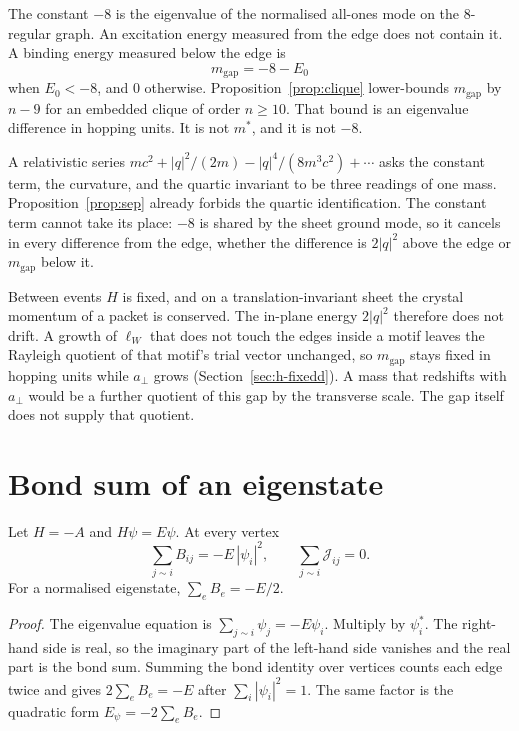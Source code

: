 The constant \(-8\) is the eigenvalue of the normalised all-ones mode on
the \(8\)-regular graph.
An excitation energy measured from the edge does not contain it.
A binding energy measured below the edge is
\[
m_{\mathrm{gap}}=-8-E_0
\]
when \(E_0<-8\), and \(0\) otherwise.
Proposition~\ref{prop:clique} lower-bounds \(m_{\mathrm{gap}}\) by \(n-9\)
for an embedded clique of order \(n\ge 10\).
That bound is an eigenvalue difference in hopping units.
It is not \(m^*\), and it is not \(-8\).

A relativistic series
\(mc^2+|q|^2/(2m)-|q|^4/(8m^3c^2)+\cdots\)
asks the constant term, the curvature, and the quartic invariant to be
three readings of one mass.
Proposition~\ref{prop:sep} already forbids the quartic identification.
The constant term cannot take its place:
\(-8\) is shared by the sheet ground mode, so it cancels in every
difference from the edge, whether the difference is \(2|q|^2\) above the
edge or \(m_{\mathrm{gap}}\) below it.

Between events \(H\) is fixed, and on a translation-invariant sheet the
crystal momentum of a packet is conserved.
The in-plane energy \(2|q|^2\) therefore does not drift.
A growth of \(\ell_W\) that does not touch the edges inside a motif leaves
the Rayleigh quotient of that motif's trial vector unchanged, so
\(m_{\mathrm{gap}}\) stays fixed in hopping units while \(a_\perp\) grows
(Section~\ref{sec:h-fixedd}).
A mass that redshifts with \(a_\perp\) would be a further quotient of this
gap by the transverse scale.
The gap itself does not supply that quotient.

\section{Bond sum of an eigenstate}
\label{sec:starsum}

\begin{lemma}
\label{lem:starsum}
Let \(H=-A\) and \(H\psi=E\psi\). At every vertex
\[
\sum_{j\sim i}B_{ij}=-E\,|\psi_i|^2,
\qquad
\sum_{j\sim i}\mathcal{J}_{ij}=0.
\]
For a normalised eigenstate, \(\sum_e B_e=-E/2\).
\end{lemma}

\begin{proof}
The eigenvalue equation is \(\sum_{j\sim i}\psi_j=-E\psi_i\).
Multiply by \(\psi_i^*\).
The right-hand side is real, so the imaginary part of the left-hand side
vanishes and the real part is the bond sum.
Summing the bond identity over vertices counts each edge twice and
gives \(2\sum_e B_e=-E\) after \(\sum_i|\psi_i|^2=1\).
The same factor is the quadratic form \(E_\psi=-2\sum_e B_e\).
\end{proof}

